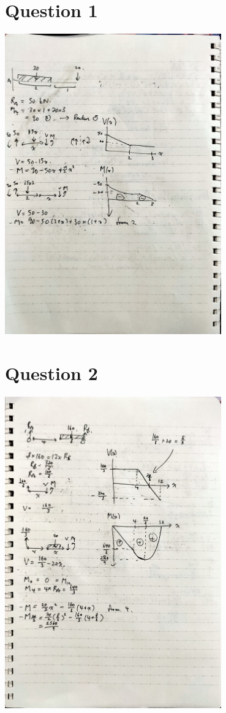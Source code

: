 \documentclass{article}
\begin{document}
\newcommand{\documentcourse}{ENGG1300}
\newcommand{\documentnumber}{3}




\centering
\section*{Question 1}
\includegraphics[width=0.7\textwidth]{img/A3Q1.jpg}
\section*{Question 2}
\includegraphics[width=0.7\textwidth]{img/A3Q2.jpeg}
\end{document}
